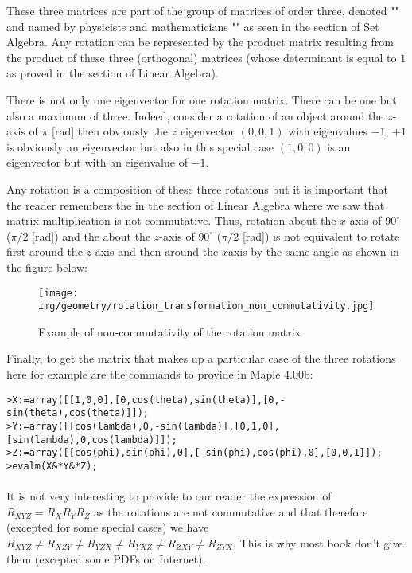 	These three matrices are part of the group of matrices of order three, denoted "" and named by physicists and mathematicians "" as seen in the section of Set Algebra. Any rotation can be represented by the product matrix resulting from the product of these three (orthogonal) matrices (whose determinant is equal to $1$ as proved in the section of Linear Algebra).
	\begin{tcolorbox}[title=Remark,colframe=black,arc=10pt]
	There is not only one eigenvector for one rotation matrix. There can be one but also a maximum of three. Indeed, consider a rotation of an object around the $z$-axis of $\pi$ [rad] then obviously the $z$ eigenvector $(0,0,1)$ with eigenvalues $-1$, $+1$ is obviously an eigenvector but also in this special case $(1,0,0)$ is an eigenvector but with an eigenvalue of $-1$.
	\end{tcolorbox}
	Any rotation is a composition of these three rotations but it is important that the reader remembers the in the section of Linear Algebra where we saw that matrix multiplication is not commutative. Thus, rotation about the $x$-axis of $90^\circ$ ($\pi/2$ [rad]) and the about the $z$-axis of  $90^\circ$ ($\pi/2$ [rad]) is not equivalent to rotate first around the $z$-axis and then around the $x$axis by the same angle as shown in the figure below:
	\begin{figure}[H]
		\centering
		\texttt{[image: img/geometry/rotation\_transformation\_non\_commutativity.jpg]}
		\caption{Example of non-commutativity of the rotation matrix}
	\end{figure}
	Finally, to get the matrix that makes up a particular case of the three rotations here for example are the commands to provide in Maple 4.00b:
	
	\texttt{>X:=array([[1,0,0],[0,cos(theta),sin(theta)],[0,-sin(theta),cos(theta)]]);\\
	>Y:=array([[cos(lambda),0,-sin(lambda)],[0,1,0],[sin(lambda),0,cos(lambda)]]);\\
	>Z:=array([[cos(phi),sin(phi),0],[-sin(phi),cos(phi),0],[0,0,1]]);
	>evalm(X\&*Y\&*Z);\\
	}\\
	
	It is not very interesting to provide to our reader the expression of $R_{XYZ}=R_XR_YR_Z$ as the rotations are not commutative and that therefore (excepted for some special cases) we have $R_{XYZ}\neq R_{XZY}\neq R_{YZX}\neq R_{YXZ}\neq R_{ZXY}\neq R_{ZYX}$. This is why most book don't give them (excepted some PDFs on Internet).
	

